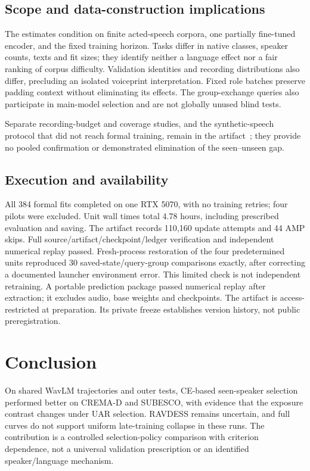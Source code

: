 \documentclass[letterpaper]{article}
\begin{document}
\subsection{Scope and data-construction implications}
The estimates condition on finite acted-speech corpora, one partially fine-tuned encoder, and the fixed training horizon. Tasks differ in native classes, speaker counts, texts and fit sizes; they identify neither a language effect nor a fair ranking of corpus difficulty. Validation identities and recording distributions also differ, precluding an isolated voiceprint interpretation. Fixed role batches preserve padding context without eliminating its effects. The group-exchange queries also participate in main-model selection and are not globally unused blind tests.

Separate recording-budget and coverage studies, and the synthetic-speech protocol that did not reach formal training, remain in the artifact~\cite{artifact}; they provide no pooled confirmation or demonstrated elimination of the seen--unseen gap.

\subsection{Execution and availability}
All 384 formal fits completed on one RTX 5070, with no training retries; four pilots were excluded. Unit wall times total 4.78 hours, including prescribed evaluation and saving. The artifact records 110,160 update attempts and 44 AMP skips. Full source/artifact/checkpoint/ledger verification and independent numerical replay passed. Fresh-process restoration of the four predetermined units reproduced 30 saved-state/query-group comparisons exactly, after correcting a documented launcher environment error. This limited check is not independent retraining. A portable prediction package passed numerical replay after extraction; it excludes audio, base weights and checkpoints. The artifact is access-restricted at preparation. Its private freeze establishes version history, not public preregistration.

\section{Conclusion}
On shared WavLM trajectories and outer tests, CE-based seen-speaker selection performed better on CREMA-D and SUBESCO, with evidence that the exposure contrast changes under UAR selection. RAVDESS remains uncertain, and full curves do not support uniform late-training collapse in these runs. The contribution is a controlled selection-policy comparison with criterion dependence, not a universal validation prescription or an identified speaker/language mechanism.
\end{document}
